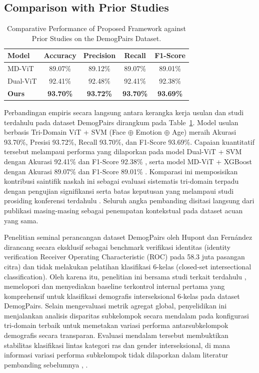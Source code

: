 \subsection{Comparison with Prior Studies}
\label{sec:comparison_prior}

\begin{table}[htbp]
\caption{Comparative Performance of Proposed Framework against Prior Studies on the DemogPairs Dataset.}
\label{tab:XII}
\centering
\begin{tabular}{lcccc}
\toprule
Model & Accuracy & Precision & Recall & F1-Score \\
\midrule
MD-ViT \cite{ref20} & 89.07\% & 89.12\% & 89.07\% & 89.01\% \\
Dual-ViT \cite{ref19} & 92.41\% & 92.48\% & 92.41\% & 92.38\% \\
\textbf{Ours} & \textbf{93.70\%} & \textbf{93.72\%} & \textbf{93.70\%} & \textbf{93.69\%} \\
\bottomrule
\end{tabular}
\end{table}

Perbandingan empiris secara langsung antara kerangka kerja usulan dan studi terdahulu pada dataset DemogPairs dirangkum pada Table~\ref{tab:XII}. Model usulan berbasis Tri-Domain ViT + SVM (Face $\oplus$ Emotion $\oplus$ Age) meraih Akurasi 93.70\%, Presisi 93.72\%, Recall 93.70\%, dan F1-Score 93.69\%. Capaian kuantitatif tersebut melampaui performa yang dilaporkan pada model Dual-ViT + SVM dengan Akurasi 92.41\% dan F1-Score 92.38\% \cite{ref19}, serta model MD-ViT + XGBoost dengan Akurasi 89.07\% dan F1-Score 89.01\% \cite{ref20}. Komparasi ini memposisikan kontribusi saintifik naskah ini sebagai evaluasi sistematis tri-domain terpadu dengan pengujian signifikansi serta batas keputusan yang melampaui studi prosiding konferensi terdahulu \cite{ref19}. Seluruh angka pembanding disitasi langsung dari publikasi masing-masing sebagai penempatan kontekstual pada dataset acuan yang sama.

Penelitian seminal perancangan dataset DemogPairs oleh Hupont dan Fern{\'a}ndez \cite{ref25} dirancang secara eksklusif sebagai benchmark verifikasi identitas (identity verification Receiver Operating Characteristic (ROC) pada 58.3 juta pasangan citra) dan tidak melakukan pelatihan klasifikasi 6-kelas (closed-set intersectional classification). Oleh karena itu, penelitian ini bersama studi terkait terdahulu \cite{ref19}, \cite{ref20} memelopori dan menyediakan baseline terkontrol internal pertama yang komprehensif untuk klasifikasi demografis interseksional 6-kelas pada dataset DemogPairs. Selain mengevaluasi metrik agregat global, penyelidikan ini menjalankan analisis disparitas subkelompok secara mendalam pada konfigurasi tri-domain terbaik untuk memetakan variasi performa antarsubkelompok demografis secara transparan. Evaluasi mendalam tersebut membuktikan stabilitas klasifikasi lintas kategori ras dan gender interseksional, di mana informasi variasi performa subkelompok tidak dilaporkan dalam literatur pembanding sebelumnya \cite{ref19}, \cite{ref20}.
